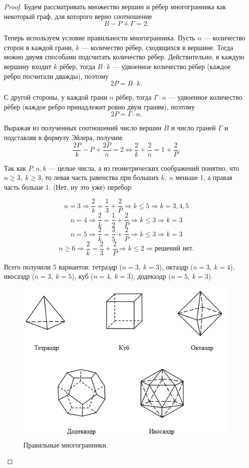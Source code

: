 \begin{proof}
    Будем рассматривать множество вершин и рёбер многогранника как некоторый граф, для которого верно соотношение \[B - P + \Gamma = 2.\]

    Теперь используем условие правильности многогранника. Пусть $n$ — количество сторон в каждой грани, $k$ — количество рёбер, сходящихся в вершине. Тогда можно двумя способами подсчитать количество рёбер. Действительно, в каждую вершину входит $k$ рёбер, тогда $B \cdot k$ — удвоенное количество рёбер (каждое ребро посчитали дважды), поэтому \[2P = B \cdot k.\]
    
    С другой стороны, у каждой грани $n$ рёбер, тогда $\Gamma \cdot n$ — удвоенное количество рёбер (каждое ребро принадлежит ровно двум граням), поэтому \[2P = \Gamma \cdot n.\]

    Выражая из полученных соотношений число вершин $B$ и число граней $\Gamma$ и подставляя в формулу Эйлера, получим:
    \[\frac{2P}{k} - P + \frac{2P}{n} = 2 \Longleftrightarrow \frac{2}{k} + \frac{2}{n} = 1 + \frac{2}{P}.\]

    Так как $P,n,k$ — целые числа, а из геометрических соображений понятно, что $n \geq 3, \ k \geq 3$, то левая часть равенства при больших $k, \ n$ меньше 1, а правая часть больше 1. (Нет, ну это уже) перебор:

    \[n = 3 \Longrightarrow \frac{2}{k} = \frac{1}{3} + \frac{2}{P} \Longrightarrow k \leq 5 \Longrightarrow k = 3,4,5\]
    \[n = 4 \Longrightarrow \frac{2}{k} = \frac{1}{2} + \frac{2}{P} \Longrightarrow k \leq 3 \Longrightarrow k = 3\]
    \[n = 5 \Longrightarrow \frac{2}{k} = \frac{3}{5} + \frac{2}{P} \Longrightarrow k \leq 3 \Longrightarrow k = 3\]
    \[n \geq 6 \Longrightarrow \frac{2}{k} = \frac{2}{3} + \frac{2}{P} \Longrightarrow k \leq 2 \Longrightarrow \text{решений нет}.\]

    Всего получили 5 вариантов: тетраэдр ($n = 3, \ k = 3$), октаэдр ($n = 3, \ k = 4$), икосаэдр ($n = 3, \ k = 5$), куб ($n = 4, \ k = 3$), додекаэдр ($n = 5, \ k = 3$).

    \begin{figure}[h]
        \centering
        \includegraphics[scale=0.8]{images/c7.5.png}
        \caption{Правильные многогранники.}
        \label{fig:c7.5}
    \end{figure}




\end{proof}
